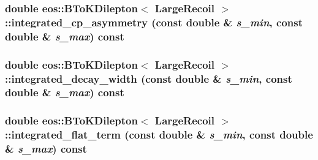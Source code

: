 \label{classeos_1_1BToKDilepton_3_01LargeRecoil_01_4_a6053c38968017aaaeadfd4ef86bfa0b5}
\hypertarget{classeos_1_1BToKDilepton_3_01LargeRecoil_01_4_ae55c560395de7f7ab6d25571849b5c0e}{
\subsubsection[{integrated\_\-cp\_\-asymmetry}]{\setlength{\rightskip}{0pt plus 5cm}double eos::BToKDilepton$<$ {\bf LargeRecoil} $>$::integrated\_\-cp\_\-asymmetry (const double \& {\em s\_\-min}, \/  const double \& {\em s\_\-max}) const}}
\label{classeos_1_1BToKDilepton_3_01LargeRecoil_01_4_ae55c560395de7f7ab6d25571849b5c0e}
\hypertarget{classeos_1_1BToKDilepton_3_01LargeRecoil_01_4_a55025133609d14e639cc4e8f1204151c}{
\subsubsection[{integrated\_\-decay\_\-width}]{\setlength{\rightskip}{0pt plus 5cm}double eos::BToKDilepton$<$ {\bf LargeRecoil} $>$::integrated\_\-decay\_\-width (const double \& {\em s\_\-min}, \/  const double \& {\em s\_\-max}) const}}
\label{classeos_1_1BToKDilepton_3_01LargeRecoil_01_4_a55025133609d14e639cc4e8f1204151c}
\hypertarget{classeos_1_1BToKDilepton_3_01LargeRecoil_01_4_a36fef9f26bcd337a7a96a1a6c70fffbd}{
\subsubsection[{integrated\_\-flat\_\-term}]{\setlength{\rightskip}{0pt plus 5cm}double eos::BToKDilepton$<$ {\bf LargeRecoil} $>$::integrated\_\-flat\_\-term (const double \& {\em s\_\-min}, \/  const double \& {\em s\_\-max}) const}}
\label{classeos_1_1BToKDilepton_3_01LargeRecoil_01_4_a36fef9f26bcd337a7a96a1a6c70fffbd}
